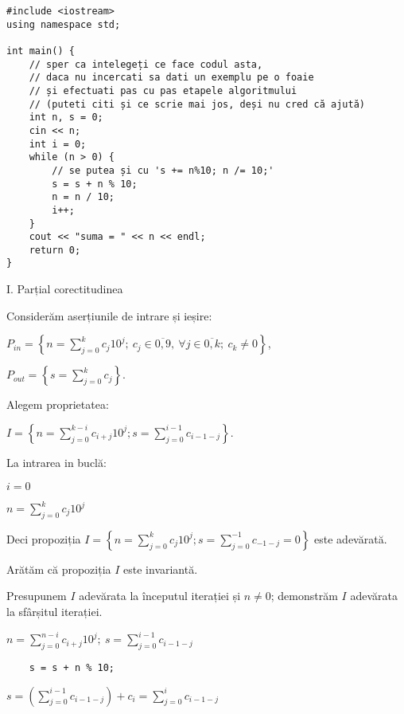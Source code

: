 \documentclass[11pt]{article}
\begin{document}
\begin{verbatim}
#include <iostream>
using namespace std;

int main() {
    // sper ca intelegeți ce face codul asta,
    // daca nu incercati sa dati un exemplu pe o foaie 
    // și efectuati pas cu pas etapele algoritmului
    // (puteti citi și ce scrie mai jos, deși nu cred că ajută)
    int n, s = 0;
    cin << n;
    int i = 0;
    while (n > 0) {
        // se putea și cu 's += n%10; n /= 10;'
        s = s + n % 10;
        n = n / 10;
        i++;
    }
    cout << "suma = " << n << endl;
    return 0;
}
\end{verbatim}

I. Parțial corectitudinea
\newline

Considerăm aserțiunile de intrare și ieșire:

$P_{in} = \left\{ n = \sum\limits_{j=0}^{k} c_{j}10^{j};\ 
                c_{j} \in \overline{0,9} ,\ \forall j \in \overline{0,k};\ 
                c_{k} \neq 0 \right\}$,

$P_{out} = \left\{ s = \sum\limits_{j=0}^{k} c_{j} \right\}$.

\vspace{14pt}
Alegem proprietatea:

$I = \left\{
              n = \sum\limits_{j=0}^{k-i}c_{i+j}10^{j};
              s = \sum\limits_{j=0}^{i-1}c_{i-1-j}
 \right\}$.

\vspace{14pt}
La intrarea in buclă:

$i = 0$

$n = \sum\limits_{j=0}^{k}c_{j}10^{j}$

Deci propoziția
$I = \left\{
              n = \sum\limits_{j=0}^{k}c_{j}10^{j};
              s = \sum\limits_{j=0}^{-1}c_{-1-j} = 0
      \right\}$ 
 este adevărată.

Arătăm că propoziția $I$ este invariantă.

Presupunem $I$ adevărata la începutul iterației și $n \ne 0$; demonstrăm $I$ adevărata la sfârșitul iterației.

$n = \sum\limits_{j=0}^{n-i}c_{i+j}10^{j};\ 
s = \sum\limits_{j=0}^{i-1}c_{i-1-j}
$
\begin{verbatim}
    s = s + n % 10;
\end{verbatim}

$s = \left( \sum\limits_{j=0}^{i-1}c_{i-1-j} \right) + c_{i}
= \sum\limits_{j=0}^{i}c_{i-1-j}
$
\end{document}
